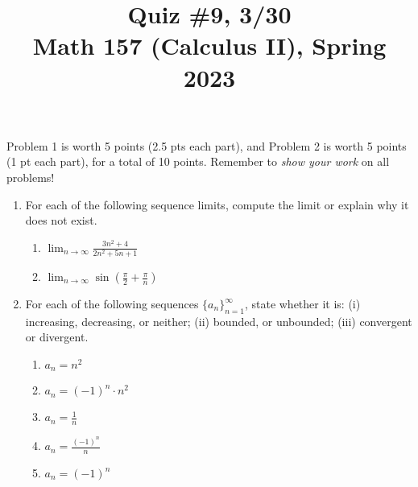\documentclass[11pt]{article}
\title{Quiz \#9, 3/30\\ Math 157 (Calculus II), Spring 2023}
\date{}
\begin{document}
\maketitle

\thispagestyle{empty}

\vspace{-2cm}

Problem 1 is worth 5 points (2.5 pts each part), and Problem 2 is worth 5 points (1 pt each part), for a total of 10 points. Remember to \emph{show your work} on all problems!

\begin{enumerate}

\item For each of the following sequence limits, compute the limit or explain why it does not exist.

\begin{enumerate}
\item $\displaystyle \lim_{n\to \infty} \frac{3n^2+4}{2n^2+5n+1}$ \\[2pt]
\item $\displaystyle \lim_{n\to \infty} \sin\left(\frac{\pi}{2}+\frac{\pi}{n}\right)$
\end{enumerate}

\vspace{2.5in}

\item For each of the following sequences $\{a_n\}_{n=1}^{\infty}$, state whether it is: (i) increasing, decreasing, or neither; (ii) bounded, or unbounded; (iii) convergent or divergent.

\begin{enumerate}
\item $a_n = n^2$
\item $a_n = (-1)^n \cdot n^2$
\item $a_n = \frac{1}{n}$
\item $a_n = \frac{(-1)^n}{n}$
\item $a_n = (-1)^n$
\end{enumerate}

\end{enumerate}
\end{document}
